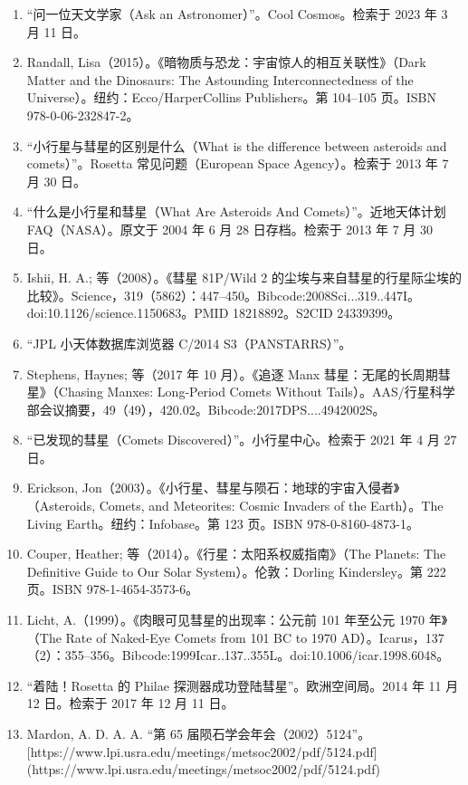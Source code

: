 \begin{enumerate}
\item “问一位天文学家（Ask an Astronomer）”。Cool Cosmos。检索于 2023 年 3 月 11 日。
\item Randall, Lisa（2015）。《暗物质与恐龙：宇宙惊人的相互关联性》（Dark Matter and the Dinosaurs: The Astounding Interconnectedness of the Universe）。纽约：Ecco/HarperCollins Publishers。第 104–105 页。ISBN 978-0-06-232847-2。
\item “小行星与彗星的区别是什么（What is the difference between asteroids and comets）”。Rosetta 常见问题（European Space Agency）。检索于 2013 年 7 月 30 日。
\item “什么是小行星和彗星（What Are Asteroids And Comets）”。近地天体计划 FAQ（NASA）。原文于 2004 年 6 月 28 日存档。检索于 2013 年 7 月 30 日。
\item Ishii, H. A.; 等（2008）。《彗星 81P/Wild 2 的尘埃与来自彗星的行星际尘埃的比较》。Science，319（5862）：447–450。Bibcode:2008Sci...319..447I。doi:10.1126/science.1150683。PMID 18218892。S2CID 24339399。
\item “JPL 小天体数据库浏览器 C/2014 S3（PANSTARRS）”。
\item Stephens, Haynes; 等（2017 年 10 月）。《追逐 Manx 彗星：无尾的长周期彗星》（Chasing Manxes: Long-Period Comets Without Tails）。AAS/行星科学部会议摘要，49（49），420.02。Bibcode:2017DPS....4942002S。
\item “已发现的彗星（Comets Discovered）”。小行星中心。检索于 2021 年 4 月 27 日。
\item Erickson, Jon（2003）。《小行星、彗星与陨石：地球的宇宙入侵者》（Asteroids, Comets, and Meteorites: Cosmic Invaders of the Earth）。The Living Earth。纽约：Infobase。第 123 页。ISBN 978-0-8160-4873-1。
\item Couper, Heather; 等（2014）。《行星：太阳系权威指南》（The Planets: The Definitive Guide to Our Solar System）。伦敦：Dorling Kindersley。第 222 页。ISBN 978-1-4654-3573-6。

\item Licht, A.（1999）。《肉眼可见彗星的出现率：公元前 101 年至公元 1970 年》（The Rate of Naked-Eye Comets from 101 BC to 1970 AD）。Icarus，137（2）：355–356。Bibcode:1999Icar..137..355L。doi:10.1006/icar.1998.6048。

\item “着陆！Rosetta 的 Philae 探测器成功登陆彗星”。欧洲空间局。2014 年 11 月 12 日。检索于 2017 年 12 月 11 日。

\item Mardon, A. D. A. A. “第 65 届陨石学会年会（2002）5124”。[https://www.lpi.usra.edu/meetings/metsoc2002/pdf/5124.pdf](https://www.lpi.usra.edu/meetings/metsoc2002/pdf/5124.pdf)


\end{enumerate}
